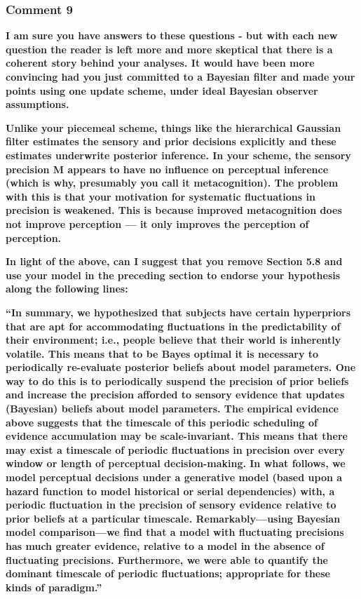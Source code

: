 \documentclass[
]{article}
\begin{document}
\hypertarget{comment-9}{%
\subsubsection{Comment 9}\label{comment-9}}

\textbf{I am sure you have answers to these questions - but with each
new question the reader is left more and more skeptical that there is a
coherent story behind your analyses. It would have been more convincing
had you just committed to a Bayesian filter and made your points using
one update scheme, under ideal Bayesian observer assumptions.}

\textbf{Unlike your piecemeal scheme, things like the hierarchical
Gaussian filter estimates the sensory and prior decisions explicitly and
these estimates underwrite posterior inference. In your scheme, the
sensory precision M appears to have no influence on perceptual inference
(which is why, presumably you call it metacognition). The problem with
this is that your motivation for systematic fluctuations in precision is
weakened. This is because improved metacognition does not improve
perception --- it only improves the perception of perception.}

\textbf{In light of the above, can I suggest that you remove Section 5.8
and use your model in the preceding section to endorse your hypothesis
along the following lines:}

\textbf{``In summary, we hypothesized that subjects have certain
hyperpriors that are apt for accommodating fluctuations in the
predictability of their environment; i.e., people believe that their
world is inherently volatile. This means that to be Bayes optimal it is
necessary to periodically re-evaluate posterior beliefs about model
parameters. One way to do this is to periodically suspend the precision
of prior beliefs and increase the precision afforded to sensory evidence
that updates (Bayesian) beliefs about model parameters. The empirical
evidence above suggests that the timescale of this periodic scheduling
of evidence accumulation may be scale-invariant. This means that there
may exist a timescale of periodic fluctuations in precision over every
window or length of perceptual decision-making. In what follows, we
model perceptual decisions under a generative model (based upon a hazard
function to model historical or serial dependencies) with, a periodic
fluctuation in the precision of sensory evidence relative to prior
beliefs at a particular timescale. Remarkably---using Bayesian model
comparison---we find that a model with fluctuating precisions has much
greater evidence, relative to a model in the absence of fluctuating
precisions. Furthermore, we were able to quantify the dominant timescale
of periodic fluctuations; appropriate for these kinds of paradigm.''}
\end{document}
